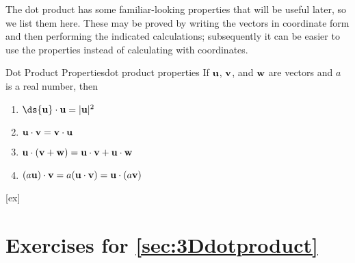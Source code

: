 The dot product has some familiar-looking properties that will be
useful later, so we list them here. These may be proved by writing the
vectors in coordinate form and then performing the indicated
calculations; subsequently it can be easier to use the properties
instead of calculating with coordinates.

\begin{theorem}{Dot Product Properties}{dot product properties}
If ${\bf u}$, ${\bf v}$, and ${\bf w}$ are vectors and $a$ is a real
number, then
\begin{enumerate}
	\item	$\ds {\bf u}\cdot{\bf u} = |{\bf u}|^2$
	\item	${\bf u}\cdot{\bf v} = {\bf v}\cdot{\bf u}$
	\item	${\bf u}\cdot({\bf v}+{\bf w}) = 
	{\bf u}\cdot{\bf v}+{\bf u}\cdot{\bf w}$
	\item	$(a{\bf u})\cdot{\bf v}=a({\bf u}\cdot{\bf v})
	={\bf u}\cdot(a{\bf v})$
\end{enumerate}
\end{theorem}


[ex]
\section*{Exercises for \ref{sec:3Ddotproduct}}

